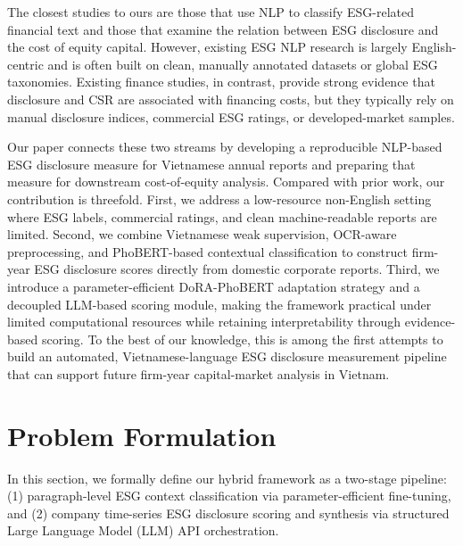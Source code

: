 \documentclass{article}
\theoremstyle{plain}
\theoremstyle{definition}
\theoremstyle{remark}
\begin{document}
The closest studies to ours are those that use NLP to classify ESG-related financial text and those that examine the relation between ESG disclosure and the cost of equity capital. 
However, existing ESG NLP research is largely English-centric and is often built on clean, manually annotated datasets or global ESG taxonomies. 
Existing finance studies, in contrast, provide strong evidence that disclosure and CSR are associated with financing costs, but they typically rely on manual disclosure indices, commercial ESG ratings, or developed-market samples.

Our paper connects these two streams by developing a reproducible NLP-based ESG disclosure measure for Vietnamese annual reports and preparing that measure for downstream cost-of-equity analysis. 
Compared with prior work, our contribution is threefold. 
First, we address a low-resource non-English setting where ESG labels, commercial ratings, and clean machine-readable reports are limited. 
Second, we combine Vietnamese weak supervision, OCR-aware preprocessing, and PhoBERT-based contextual classification to construct firm-year ESG disclosure scores directly from domestic corporate reports. 
Third, we introduce a parameter-efficient DoRA-PhoBERT adaptation strategy and a decoupled LLM-based scoring module, making the framework practical under limited computational resources while retaining interpretability through evidence-based scoring. 
To the best of our knowledge, this is among the first attempts to build an automated, Vietnamese-language ESG disclosure measurement pipeline that can support future firm-year capital-market analysis in Vietnam.

\section{Problem Formulation}
\label{sec:problem_formulation}

In this section, we formally define our hybrid framework as a two-stage pipeline: (1) paragraph-level ESG context classification via parameter-efficient fine-tuning, and (2) company time-series ESG disclosure scoring and synthesis via structured Large Language Model (LLM) API orchestration.
\end{document}
